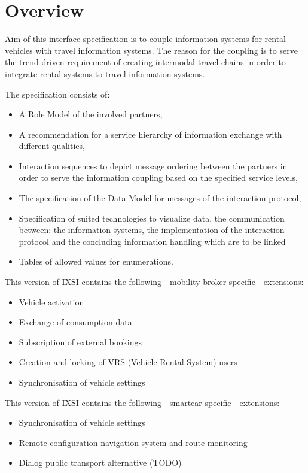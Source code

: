 \chapter{Overview}
\label{cha:Zusammenfassung}

Aim of this interface specification is to couple information systems for rental vehicles with travel information systems.
The reason for the coupling is to serve the trend driven requirement of creating intermodal travel chains in order to integrate rental systems to travel information systems.

The specification consists of:
\begin{itemize}
\item A Role Model of the involved partners,
\item A recommendation for a service hierarchy of information exchange with different qualities,
\item Interaction sequences to depict message ordering between the partners in order to serve the information coupling based on the specified service levels,
\item The specification of the Data Model for messages of the interaction protocol,
\item Specification of suited technologies to visualize data, the communication between: the information systems, the implementation of the interaction protocol and the concluding information handling which are to be linked
\item Tables of allowed values for enumerations.
\end{itemize}
This version of IXSI contains the following - mobility broker specific - extensions:
\begin{itemize}
	\item Vehicle activation 
	\item Exchange of consumption data 
	\item Subscription of external bookings
	\item Creation and locking of VRS (Vehicle Rental System) users
	\item Synchronisation of vehicle settings 
\end{itemize}
This version of IXSI contains the following -  smartcar specific - extensions:
\begin{itemize}
	\item Synchronisation of vehicle settings
	\item Remote configuration navigation system and route monitoring
	\item Dialog public transport alternative (TODO)
\end{itemize}
